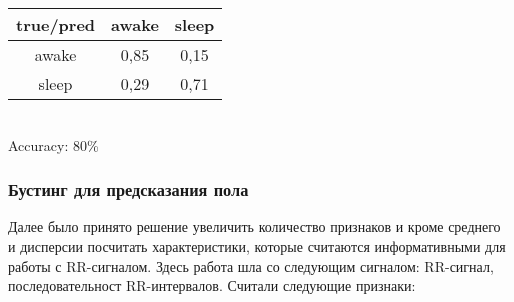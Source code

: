 \begin{tabular}{|c|c|c|}
	\hline \rule[-2ex]{0pt}{5.5ex} true/pred & awake & sleep \\ 
	\hline \rule[-2ex]{0pt}{5.5ex} awake & 0,85 & 0,15 \\ 
	\hline \rule[-2ex]{0pt}{5.5ex} sleep & 0,29 & 0,71 \\ 
	\hline 
	
\end{tabular}\\

Accuracy:  80\%

\subsubsection{Бустинг для предсказания пола}
Далее было принято решение увеличить количество признаков и кроме среднего и дисперсии посчитать характеристики, которые считаются информативными для работы с RR-сигналом. Здесь работа шла со следующим сигналом: RR-сигнал, последовательност RR-интервалов.
Считали следующие признаки:
